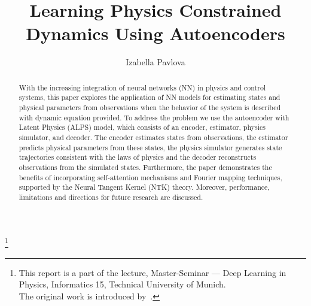 \documentclass[acmtog]{techreportacmart}
\begin{document}
\title{Learning Physics Constrained Dynamics Using Autoencoders} 
\author{Izabella Pavlova}

\renewcommand\shortauthors{Pavlova}

\begin{abstract}
With the increasing integration of neural networks (NN) in physics and control systems, this paper explores the application of NN models for estimating states and physical parameters from observations when the behavior of the system is described with dynamic equation provided. To address the problem we use the autoencoder with Latent Physics (ALPS) model, which consists of an encoder, estimator, physics simulator, and decoder. The encoder estimates states from observations, the estimator predicts physical parameters from these states, the physics simulator generates state trajectories consistent with the laws of physics and the decoder reconstructs observations from the simulated states. Furthermore, the paper demonstrates the benefits of incorporating self-attention mechanisms and Fourier mapping techniques, supported by the Neural Tangent Kernel (NTK) theory. Moreover, performance, limitations and directions for future research are discussed.
\end{abstract}

%
%



\thanks{This report is a part of the lecture, Master-Seminar --- Deep Learning in Physics, Informatics 15, Technical University of Munich.
\\
The original work is introduced by~\cite{NEURIPS2022_6d5e0357}.}
\maketitle
\end{document}

